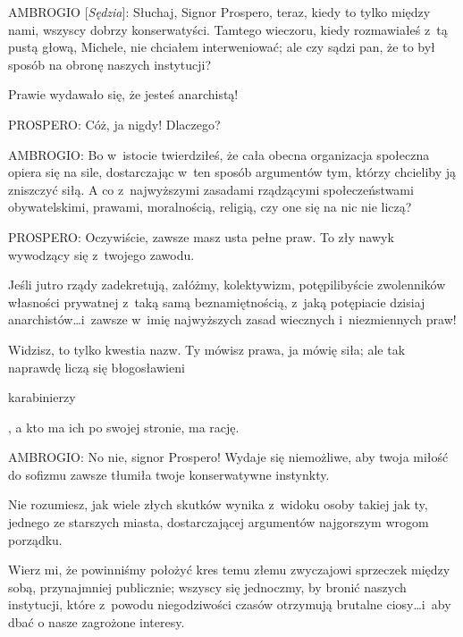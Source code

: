 \documentclass[oneside,polish,11pt,sfheadings]{mwbk}
\begin{document}
 
\noindent AMBROGIO [\textit{Sędzia}]: Słuchaj, Signor Prospero, teraz, kiedy to tylko między nami, wszyscy dobrzy
konserwatyści. Tamtego wieczoru, kiedy rozmawiałeś z~tą pustą głową, Michele, nie chciałem interweniować; ale czy sądzi
pan, że to był sposób na obronę naszych instytucji? 

 
Prawie wydawało się, że jesteś anarchistą! 




 
\noindent PROSPERO: Cóż, ja nigdy! Dlaczego? 




 
\noindent AMBROGIO: Bo w~istocie twierdziłeś, że cała obecna organizacja społeczna opiera się na sile, dostarczając w~ten sposób
argumentów tym, którzy chcieliby ją zniszczyć siłą. A co z~najwyższymi zasadami rządzącymi społeczeństwami
obywatelskimi, prawami, moralnością, religią, czy one się na nic nie liczą? 




 
\noindent PROSPERO: Oczywiście, zawsze masz usta pełne praw.  To zły nawyk wywodzący się z~twojego zawodu. 

 
Jeśli jutro rządy zadekretują, załóżmy, kolektywizm, potępilibyście zwolenników własności prywatnej z~taką samą
beznamiętnością, z~jaką potępiacie dzisiaj anarchistów\ldots i~zawsze w~imię najwyższych zasad wiecznych i~niezmiennych
praw! 

 
Widzisz, to tylko kwestia nazw. Ty mówisz prawa, ja mówię siła; ale tak naprawdę liczą się błogosławieni
\begin{itshape}karabinierzy \end{itshape}, a kto ma ich po swojej stronie, ma rację. 




 
\noindent AMBROGIO: No nie, signor Prospero! Wydaje się niemożliwe, aby twoja miłość do sofizmu zawsze tłumiła twoje konserwatywne
instynkty. 

 
Nie rozumiesz, jak wiele złych skutków wynika z~widoku osoby takiej jak ty, jednego ze starszych miasta, dostarczającej
argumentów najgorszym wrogom porządku. 

 
Wierz mi, że powinniśmy położyć kres temu złemu zwyczajowi sprzeczek między sobą, przynajmniej publicznie; wszyscy się
jednoczmy, by bronić naszych instytucji, które z~powodu niegodziwości czasów otrzymują brutalne ciosy\ldots i~aby dbać o
nasze zagrożone interesy. 
\end{document}
